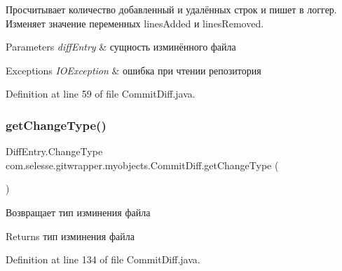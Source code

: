 Просчитывает количество добавленный и удалённых строк и пишет в логгер. Изменяет значение переменных lines\+Added и lines\+Removed.


\begin{DoxyParams}{Parameters}
{\em diff\+Entry} & сущность изминённого файла \\
\hline
\end{DoxyParams}

\begin{DoxyExceptions}{Exceptions}
{\em I\+O\+Exception} & ошибка при чтении репозитория \\
\hline
\end{DoxyExceptions}


Definition at line 59 of file Commit\+Diff.\+java.

\mbox{\label{classcom_1_1selesse_1_1gitwrapper_1_1myobjects_1_1_commit_diff_a4c7a8245ef85e81ea1e1dae4ac3dcf90}} 
\subsubsection{\texorpdfstring{get\+Change\+Type()}{getChangeType()}}
{\footnotesize\ttfamily Diff\+Entry.\+Change\+Type com.\+selesse.\+gitwrapper.\+myobjects.\+Commit\+Diff.\+get\+Change\+Type (\begin{DoxyParamCaption}{ }\end{DoxyParamCaption})}

Возвращает тип изминения файла

\begin{DoxyReturn}{Returns}
тип изминения файла 
\end{DoxyReturn}


Definition at line 134 of file Commit\+Diff.\+java.

\mbox{\label{classcom_1_1selesse_1_1gitwrapper_1_1myobjects_1_1_commit_diff_ab09f25be8f406c82ae2e26889f821136}} 
